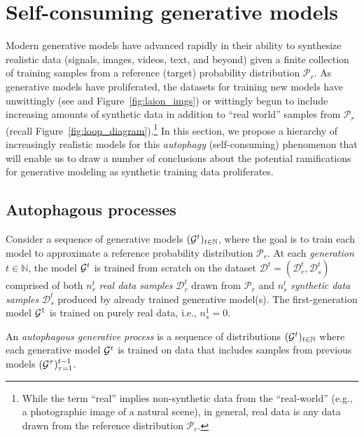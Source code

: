 \documentclass{article}
\def\data{\mathcal{D}}
\begin{document}
\section{Self-consuming generative models} 
\label{sec:background}

Modern generative models have advanced rapidly in their ability to synthesize realistic data (signals, images, videos, text, and beyond) given a finite collection of training samples from a reference (target) probability distribution $\mathcal{P}_r$. 
As generative models have proliferated, the datasets for training new models have unwittingly (see \cite{laion} and Figure~\ref{fig:laion_imgs})  or wittingly \cite{10.1007/978-3-031-18576-2_12,deng2022openfwi, llms_self_improve, self_instruct, alpaca} begun to include increasing amounts of synthetic data in addition to ``real world'' samples from $\mathcal{P}_r$
(recall Figure~\ref{fig:loop_diagram}).\footnote{
While the term ``real'' implies non-synthetic data from the ``real-world'' (e.g., a photographic image of a natural scene), in general, real data is any data drawn from the reference distribution $\mathcal{P}_r$.
}
In this section, we propose a hierarchy of increasingly realistic models for this {\em autophagy} (self-consuming) phenomenon that will enable us to draw a number of conclusions about the potential ramifications for generative modeling as synthetic training data proliferates.



\subsection{Autophagous processes}

Consider a sequence of generative models $(\mathcal{G}^t)_{t\in \mathbb{N}}$, where the goal is to train each model to approximate a reference probability distribution $\mathcal{P}_r$. 
At each {\em generation} $t \in \mathbb{N}$, the model $\mathcal{G}^t$ is trained from scratch on the dataset $\data^t = (\data_r^t, \data_s^t)$ comprised of both $n_r^t$ {\em real data samples} $\data_r^t$ drawn from $\mathcal{P}_r$ and $n_s^t$ {\em synthetic data samples} $\data_s^t$ produced by already trained generative model(s). The first-generation model $\mathcal{G}^1$ is trained on purely real data, i.e., $n_s^1 = 0$.


\medskip
\begin{definition*}
    An \emph{autophagous generative process} is a sequence of distributions $(\mathcal{G}^t)_{t\in\mathbb{N}}$ where each generative model $\mathcal{G}^t$ is trained on data that includes samples from previous models $(\mathcal{G}^\tau)_{\tau=1}^{t-1}$.
\end{definition*}
\end{document}
